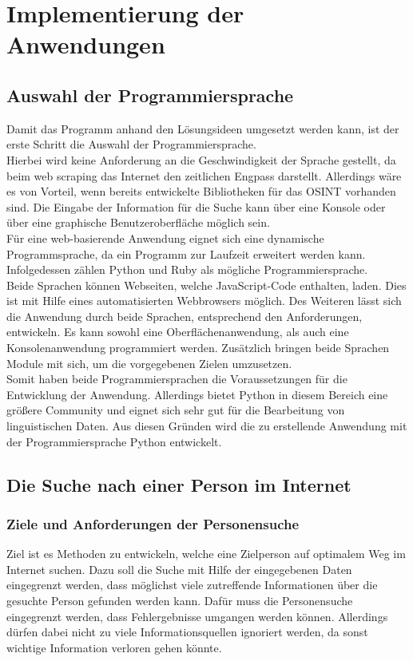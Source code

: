 
\chapter{Implementierung der Anwendungen}  %
\label{cha:Informationsbeschaffung einer ausgewählten Person} %
\section{Auswahl der Programmiersprache}
Damit das Programm anhand den Lösungsideen umgesetzt werden kann, ist der erste Schritt die Auswahl der Programmiersprache.\\
Hierbei wird keine Anforderung an die Geschwindigkeit der Sprache gestellt, da beim web scraping das Internet den zeitlichen Engpass darstellt. Allerdings wäre es von Vorteil, wenn bereits entwickelte Bibliotheken für das OSINT vorhanden sind. Die Eingabe der Information für die Suche kann über eine Konsole oder über eine graphische Benutzeroberfläche möglich sein.\\
Für eine web-basierende Anwendung eignet sich eine dynamische Programmsprache, da ein Programm zur Laufzeit erweitert werden kann. Infolgedessen zählen Python und Ruby als mögliche Programmiersprache.\\
Beide Sprachen können Webseiten, welche JavaScript-Code enthalten, laden. Dies ist mit Hilfe eines automatisierten Webbrowsers möglich. Des Weiteren lässt sich die Anwendung durch beide Sprachen, entsprechend den Anforderungen, entwickeln. Es kann sowohl eine Oberflächenanwendung, als auch eine Konsolenanwendung programmiert werden. Zusätzlich bringen beide Sprachen Module mit sich, um die vorgegebenen Zielen umzusetzen.\\ Somit haben beide Programmiersprachen die Voraussetzungen für die Entwicklung der Anwendung. Allerdings bietet Python in diesem Bereich eine größere Community und eignet sich sehr gut für die Bearbeitung von linguistischen Daten. \cite{bird2009natural}Aus diesen Gründen wird die zu erstellende Anwendung mit der Programmiersprache Python entwickelt.

\section{Die Suche nach einer Person im Internet}
	\subsection{Ziele und Anforderungen der Personensuche}
	Ziel ist es Methoden zu entwickeln, welche eine Zielperson auf optimalem Weg im Internet suchen. Dazu soll die Suche mit Hilfe der eingegebenen Daten eingegrenzt werden, dass möglichst viele zutreffende Informationen über die gesuchte Person gefunden werden kann. Dafür muss die Personensuche eingegrenzt werden, dass Fehlergebnisse umgangen werden können. Allerdings dürfen dabei nicht zu viele Informationsquellen ignoriert werden, da sonst wichtige Information verloren gehen könnte.
	
